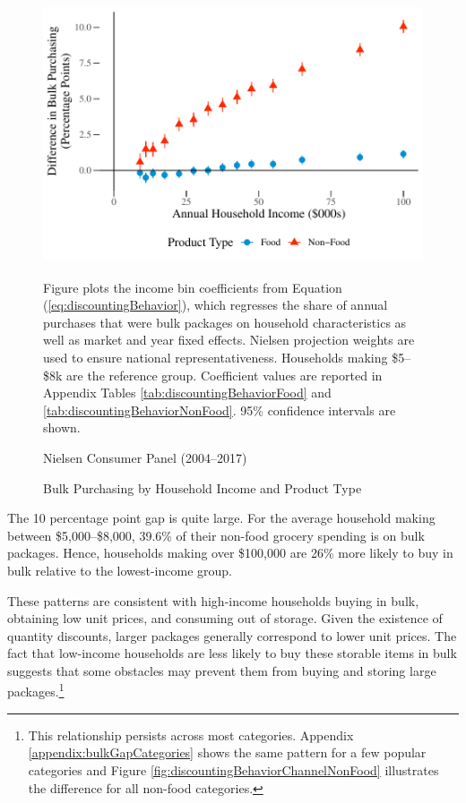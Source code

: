 \documentclass[AER]{AEA_mal}
\begin{document}
\begin{figure}[!htb]
\centering
\caption{Bulk Purchasing by Household Income and Product Type}
\includegraphics[width = 5in, height = 3in]{../5_figures/savingsBehavior.pdf}
\begin{figurenotes}
Figure plots the income bin coefficients from Equation (\ref{eq:discountingBehavior}), which regresses the share of annual purchases that were bulk packages on household characteristics as well as market and year fixed effects. Nielsen projection weights are used to ensure national representativeness. Households making \$5--\$8k are the reference group. Coefficient values are reported in Appendix Tables \ref{tab:discountingBehaviorFood} and \ref{tab:discountingBehaviorNonFood}. 95\% confidence intervals are shown.
\end{figurenotes}
\begin{figurenotes}[Source]
Nielsen Consumer Panel (2004--2017)
\end{figurenotes}
\label{fig:savingsBehavior}
\end{figure}

The 10 percentage point gap is quite large. For the average household making between \$5,000--\$8,000, 39.6\% of their non-food grocery spending is on bulk packages. Hence, households making over \$100,000 are 26\% more likely to buy in bulk relative to the lowest-income group.

These patterns are consistent with high-income households buying in bulk, obtaining low unit prices, and consuming out of storage. Given the existence of quantity discounts, larger packages generally correspond to lower unit prices. The fact that low-income households are less likely to buy these storable items in bulk suggests that some obstacles may prevent them from buying and storing large packages.\footnote{This relationship persists across most categories. Appendix \ref{appendix:bulkGapCategories} shows the same pattern for a few popular categories and Figure \ref{fig:discountingBehaviorChannelNonFood} illustrates the difference for all non-food categories.}
\end{document}
